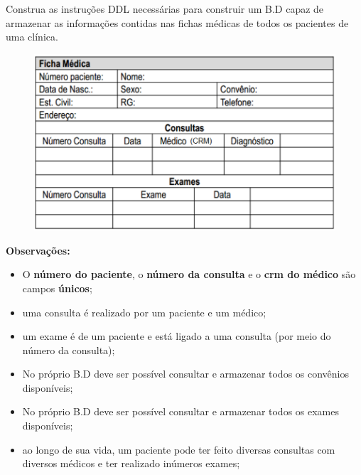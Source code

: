 \documentclass[12pt]{exam}
\begin{document}
\begin{questions}
\question[1.0] Construa as instruções DDL necessárias para construir um B.D capaz de armazenar as informações contidas nas fichas médicas de todos os pacientes de uma clínica. %
\label{q:fica_medica}

\begin{figure}[!ht]
    \centering
    \includegraphics[scale=0.4]{figuras/ficha_medica}
    \label{fig:ficha_medica}
\end{figure}

\textbf{Observações:}

\begin{itemize}
    \item O \textbf{número do paciente}, o \textbf{número da consulta} e o \textbf{crm do médico} são campos \textbf{únicos};
    \item uma consulta é realizado por um paciente e um médico;
    \item um exame é de um paciente e está ligado a uma consulta (por meio do número da consulta);
    \item No próprio B.D deve ser possível consultar e armazenar todos os convênios disponíveis;
    \item No próprio B.D deve ser possível consultar e armazenar todos os exames disponíveis; %
    \item ao longo de sua vida, um paciente pode ter feito diversas consultas com diversos médicos e ter realizado inúmeros exames; 
\end{itemize}



\end{questions}
\end{document}
